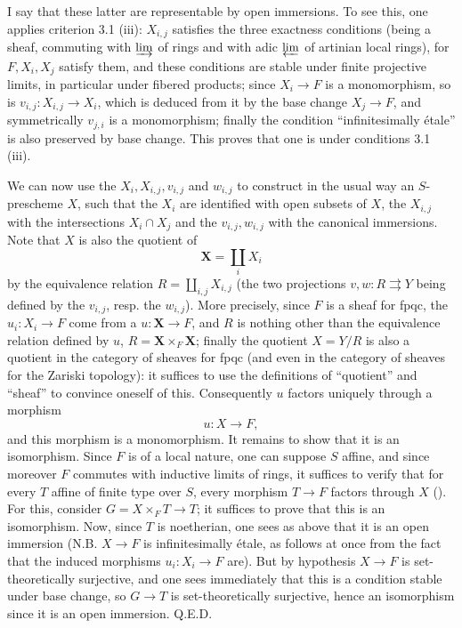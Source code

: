 I say that these latter are representable by open immersions. To see this, one applies criterion 3.1 (iii): $X_{i,j}$ satisfies the three exactness conditions (being a sheaf, commuting with $\varinjlim$ of rings and with adic $\varprojlim$ of artinian local rings), for $F,X_i,X_j$ satisfy them, and these conditions are stable under finite projective limits, in particular under fibered products; since $X_i\to F$ is a monomorphism, so is $v_{i,j}:X_{i,j}\to X_i$, which is deduced from it by the base change $X_j\to F$, and symmetrically $v_{j,i}$ is a monomorphism; finally the condition ``infinitesimally étale'' is also preserved by base change. This proves that one is under conditions 3.1 (iii).

We can now use the $X_i,X_{i,j},v_{i,j}$ and $w_{i,j}$ to construct in the usual way an $S$-prescheme $X$, such that the $X_i$ are identified with open subsets of $X$, the $X_{i,j}$ with the intersections $X_i\cap X_j$ and the $v_{i,j},w_{i,j}$ with the canonical immersions. Note that $X$ is also the quotient of
\[
\mathbf X=\coprod_i X_i
\]
by the equivalence relation $R=\coprod_{i,j}X_{i,j}$ (the two projections $v,w:R\rightrightarrows Y$ being defined by the $v_{i,j}$, resp. the $w_{i,j}$). More precisely, since $F$ is a sheaf for fpqc, the $u_i:X_i\to F$ come from a $u:\mathbf X\to F$, and $R$ is nothing other than the equivalence relation defined by $u$, $R=\mathbf X\times_F\mathbf X$; finally the quotient $X=Y/R$ is also a quotient in the category of sheaves for fpqc (and even in the category of sheaves for the Zariski topology): it suffices to use the definitions of ``quotient'' and ``sheaf'' to convince oneself of this. Consequently $u$ factors uniquely through a morphism
\[
u:X\to F,
\]
and this morphism is a monomorphism. It remains to show that it is an isomorphism. Since $F$ is of a local nature, one can suppose $S$ affine, and since moreover $F$ commutes with inductive limits of rings, it suffices to verify that for every $T$ affine of finite type over $S$, every morphism $T\to F$ factors through $X$ (). For this, consider $G=X\times_F T\to T$; it suffices to prove that this is an isomorphism. Now, since $T$ is noetherian, one sees as above that it is an open immersion (N.B. $X\to F$ is infinitesimally étale, as follows at once from the fact that the induced morphisms $u_i:X_i\to F$ are). But by hypothesis $X\to F$ is set-theoretically surjective, and one sees immediately that this is a condition stable under base change, so $G\to T$ is set-theoretically surjective, hence an isomorphism since it is an open immersion. \hfill Q.E.D.


